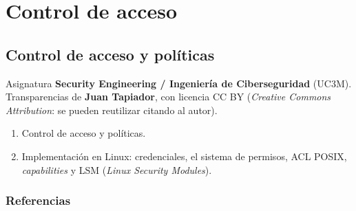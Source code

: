 \documentclass[11pt,a4paper]{report}
\begin{document}
\part{Control de acceso}
 
\chapter{Control de acceso y políticas}
 
\begin{importante}[title={Sobre este tema}]
Asignatura \textbf{Security Engineering / Ingeniería de Ciberseguridad} (UC3M). Transparencias de \textbf{Juan Tapiador}, con licencia CC BY (\emph{Creative Commons Attribution}: se pueden reutilizar citando al autor).
\begin{enumerate}
  \item Control de acceso y políticas.
  \item Implementación en Linux: credenciales, el sistema de permisos, ACL POSIX, \emph{capabilities} y LSM (\emph{Linux Security Modules}).
\end{enumerate}
\end{importante}
 
\section{Referencias}
 
\end{document}
